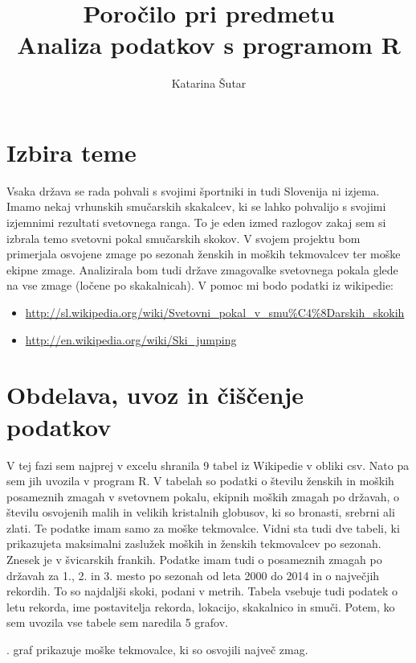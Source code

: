 \documentclass[11pt,a4paper]{article}
\begin{document}
\title{Poročilo pri predmetu \\
Analiza podatkov s programom R}
\author{Katarina Šutar}
\maketitle

\section{Izbira teme}

Vsaka država se rada pohvali s svojimi športniki in tudi Slovenija ni izjema. Imamo nekaj vrhunskih smučarskih skakalcev, ki se lahko pohvalijo s svojimi izjemnimi rezultati svetovnega ranga. To je eden izmed razlogov zakaj sem si izbrala temo svetovni pokal smučarskih skokov. V svojem projektu bom primerjala osvojene zmage po sezonah ženskih in moških tekmovalcev ter moške ekipne zmage. Analizirala bom tudi države zmagovalke svetovnega pokala glede na vse zmage (ločene po skakalnicah). V pomoc mi bodo podatki iz wikipedie:
\begin{itemize}
\item \url{http://sl.wikipedia.org/wiki/Svetovni_pokal_v_smu%C4%8Darskih_skokih}
\item \url{http://en.wikipedia.org/wiki/Ski_jumping}
\end{itemize}


\section{Obdelava, uvoz in čiščenje podatkov}

V tej fazi sem najprej v excelu shranila 9 tabel iz Wikipedie v obliki csv. Nato pa sem jih uvozila v program R. V tabelah so podatki o številu ženskih in moških posameznih zmagah v svetovnem pokalu, ekipnih moških zmagah po državah, o številu osvojenih malih in velikih kristalnih globusov, ki so bronasti, srebrni ali zlati. Te podatke imam samo za moške tekmovalce. Vidni sta tudi dve tabeli, ki prikazujeta maksimalni zaslužek moških in ženskih tekmovalcev po sezonah. Znesek je v švicarskih frankih. Podatke imam tudi o posameznih zmagah po državah za 1., 2. in 3. mesto po sezonah od leta 2000 do 2014 in o največjih rekordih. To so najdaljši skoki, podani v metrih. Tabela vsebuje tudi podatek o letu rekorda, ime postavitelja rekorda, lokacijo, skakalnico in smuči. Potem, ko sem uvozila vse tabele sem naredila 5 grafov. 

. graf prikazuje moške tekmovalce, ki so osvojili največ zmag.
\end{document}
